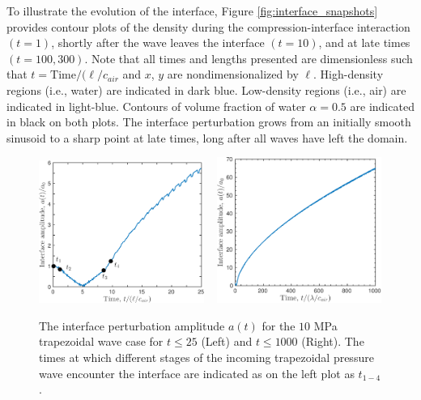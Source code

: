 % 
To illustrate the evolution of the interface, Figure
\ref{fig:interface_snapshots} provides contour plots of the density
during the compression-interface interaction $(t=1)$, shortly after
the wave leaves the interface $(t=10)$, and at late times
$(t=100, 300)$. Note that all times and lengths presented are
dimensionless such that $t = \text{Time}/(\ell/c_{air}$ and $x$,
$y$ are nondimensionalized by $\ell$. High-density regions (i.e.,
water) are indicated in dark blue. Low-density regions (i.e., air) are
indicated in light-blue. Contours of volume fraction of water
$\alpha=0.5$ are indicated in black on both plots. The interface
perturbation grows from an initially smooth sinusoid to a sharp point
at late times, long after all waves have left the domain.
% 
\begin{figure}[h] 
  \centering
  \includegraphics[width=0.48\textwidth]{./figs/lung_figs/trapz10_intf_schematic}
  ~
  \includegraphics[width=0.48\textwidth]{./figs/lung_figs/interface_single-case_linear}%
  \caption[The interface perturbation amplitude history for 10 MPa]{The
    interface perturbation amplitude $a(t)$ for the $10$ MPa
    trapezoidal wave case for $t\leq25$ (Left) and $t\leq1000$ (Right). The times at which different
    stages of the incoming trapezoidal pressure wave encounter the
    interface are indicated as on the left plot as $t_{1-4}$.  }
  \label{fig:trapz10_interface}
\end{figure}\par
